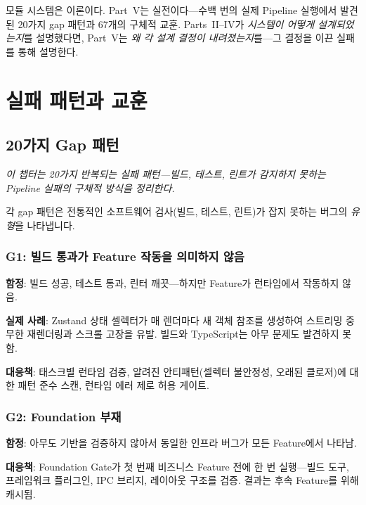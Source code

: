 \documentclass[11pt,a4paper,openright,twoside]{report}
\begin{document}
모듈 시스템은 이론이다. Part~V는 실전이다---수백 번의 실제 Pipeline 실행에서 발견된 20가지 gap 패턴과 67개의 구체적 교훈. Parts~II--IV가 \emph{시스템이 어떻게 설계되었는지}를 설명했다면, Part~V는 \emph{왜 각 설계 결정이 내려졌는지}를---그 결정을 이끈 실패를 통해 설명한다.

\part{실패 패턴과 교훈}

\chapter{20가지 Gap 패턴}
\label{ch:gaps}

\textit{이 챕터는 20가지 반복되는 실패 패턴---빌드, 테스트, 린트가 감지하지 못하는 Pipeline 실패의 구체적 방식을 정리한다.}

각 gap 패턴은 전통적인 소프트웨어 검사(빌드, 테스트, 린트)가 잡지 못하는 버그의 \emph{유형}을 나타냅니다.

\section{G1: 빌드 통과가 Feature 작동을 의미하지 않음}

\textbf{함정}: 빌드 성공, 테스트 통과, 린터 깨끗---하지만 Feature가 런타임에서 작동하지 않음.

\textbf{실제 사례}: Zustand 상태 셀렉터가 매 렌더마다 새 객체 참조를 생성하여 스트리밍 중 무한 재렌더링과 스크롤 고장을 유발. 빌드와 TypeScript는 아무 문제도 발견하지 못함.

\textbf{대응책}: 태스크별 런타임 검증, 알려진 안티패턴(셀렉터 불안정성, 오래된 클로저)에 대한 패턴 준수 스캔, 런타임 에러 제로 허용 게이트.

\section{G2: Foundation 부재}

\textbf{함정}: 아무도 기반을 검증하지 않아서 동일한 인프라 버그가 모든 Feature에서 나타남.

\textbf{대응책}: Foundation Gate가 첫 번째 비즈니스 Feature 전에 한 번 실행---빌드 도구, 프레임워크 플러그인, IPC 브리지, 레이아웃 구조를 검증. 결과는 후속 Feature를 위해 캐시됨.
\end{document}

